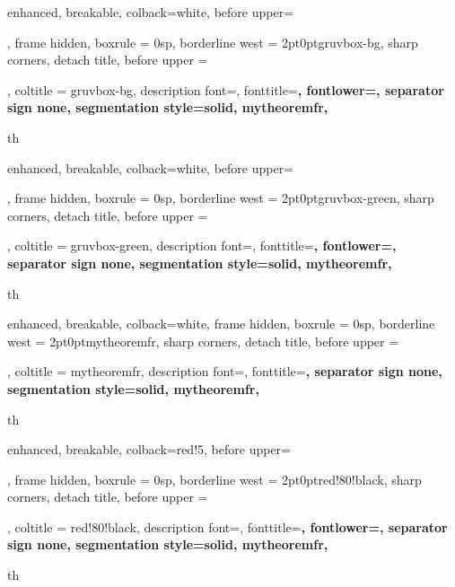 {
	enhanced,
	breakable,
	colback=white,
  before upper=\tcbtitle\par\Hugeskip,
	frame hidden,
	boxrule = 0sp,
	borderline west = {2pt}{0pt}{gruvbox-bg},
	sharp corners,
	detach title,
	before upper = \tcbtitle\par\smallskip,
	coltitle = gruvbox-bg,
	description font=\mdseries{}\selectfont,
	fonttitle=\selectfont\bfseries,
	fontlower=\selectfont,
  separator sign none,
	segmentation style={solid, mytheoremfr},
}
{th}

{
	enhanced,
	breakable,
	colback=white,
  before upper=\tcbtitle\par\Hugeskip,
	frame hidden,
	boxrule = 0sp,
	borderline west = {2pt}{0pt}{gruvbox-green},
	sharp corners,
	detach title,
	before upper = \tcbtitle\par\smallskip,
	coltitle = gruvbox-green,
	description font=\mdseries{}\selectfont,
	fonttitle=\selectfont\bfseries,
	fontlower=\selectfont,
  separator sign none,
	segmentation style={solid, mytheoremfr},
}
{th}

{
	enhanced,
	breakable,
	colback=white,
	frame hidden,
	boxrule = 0sp,
	borderline west = {2pt}{0pt}{mytheoremfr},
	sharp corners,
	detach title,
	before upper = \tcbtitle\par\smallskip,
	coltitle = mytheoremfr,
	description font=\selectfont,
	fonttitle=\selectfont\bfseries,
	separator sign none,
	segmentation style={solid, mytheoremfr},
}
{th}

{
enhanced,
breakable,
colback=red!5,
  before upper=\tcbtitle\par\Hugeskip,
frame hidden,
boxrule = 0sp,
borderline west = {2pt}{0pt}{red!80!black},
sharp corners,
detach title,
before upper = \tcbtitle\par\smallskip,
coltitle = red!80!black,
description font=\mdseries{}\selectfont,
fonttitle=\selectfont\bfseries,
fontlower=\selectfont,
  separator sign none,
segmentation style={solid, mytheoremfr},
}
{th}


